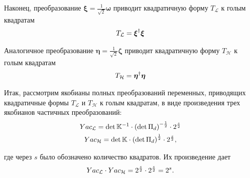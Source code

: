 \documentclass[12pt]{article}
\newcommand{\lb}{\left(}
\newcommand{\rb}{\right)}
\newcommand{\mL}{\mathcal{L}}
\newcommand{\mH}{\mathcal{H}}
\begin{document}
Наконец, преобразование $\boldsymbol{\xi} = \frac{1}{\sqrt{2}} \boldsymbol{\omega}$ приводит квадратичную форму $T_\mL$ к голым квадратам
\begin{gather}
	T_\mL = \boldsymbol{\xi}^\dagger \boldsymbol{\xi} \notag
\end{gather}

Аналогичное преобразование $\boldsymbol{\eta} = \frac{1}{\sqrt{2}} \boldsymbol{\zeta}$ приводит квадратичную форму $T_\mH$ к голым квадратам
\begin{gather}
	T_\mH = \boldsymbol{\eta}^\dagger \boldsymbol{\eta} \notag
\end{gather}

Итак, рассмотрим якобианы полных преобразований переменных, приводящих квадратичные формы $T_\mL$ и $T_\mH$ к голым квадратам, в виде произведения трех якобианов частичных преобразований:
\begin{gather}
	Yac_\mL = \det \mathbb{K}^{-1} \cdot \lb \det \Pi_d \rb ^{-\frac{1}{2}} \cdot 2^\frac{s}{2} \notag \\
	Yac_\mH = \det \mathbb{K} \cdot \lb \det \Pi_d \rb^\frac{1}{2} \cdot 2^\frac{s}{2}, \notag
\end{gather}

где через $s$ было обозначено количество квадратов. Их произведение дает
\begin{gather}
	Yac_\mL \cdot Yac_\mH = 2^\frac{s}{2} \cdot 2^\frac{s}{2} = 2^s. \notag
\end{gather}
\end{document}
